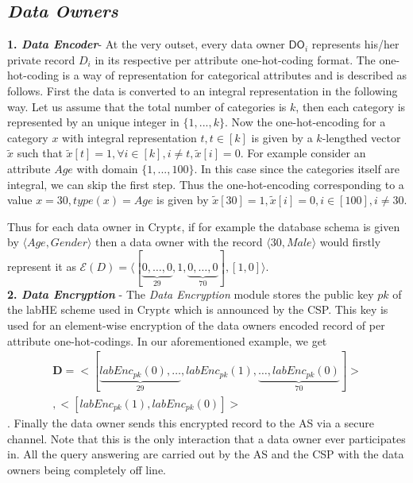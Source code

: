 \subsection*{\textit{Data Owners}}
\textbf{1. \textit{Data Encoder}}-  At the very outset, every data owner  $\textsf{DO}_i$ represents his/her private record $D_i$ in its respective per attribute one-hot-coding format. The one-hot-coding is a way of representation for categorical attributes and is described as follows. First the data is converted to an integral representation in the following way. Let us assume that the total number of categories is $k$, then each category is represented by an unique integer in $\{1,..., k\}$. Now the one-hot-encoding for a category $x$ with integral representation $t , t \in [k]$ is given by a $k$-lengthed vector $\tilde{x}$ such that $\tilde{x}[t]=1, \forall i \in [k], i\neq t, \tilde{x}[i]=0$. 
For example consider an attribute $Age$ with domain $\{1,...,100\}$. In this case since the categories itself are integral, we can skip the first step. Thus the one-hot-encoding corresponding to a value $x=30, type(x)=Age$ is given by $\tilde{x}[30]=1, \tilde{x}[i]=0, i \in [100], i \neq 30 $. 
Thus for each data owner in Crypt$\epsilon$, if for example  the database schema is given by  $\langle Age,Gender\rangle$ then a data owner with the record $\langle 30, Male\rangle$ would firstly represent it as $\mathcal{E}(D)=\langle[\underbrace{0,\ldots,0}_{29},1,\underbrace{0,\ldots,0}_{70}],[1,0]\rangle$. \\
\textbf{2. \textit{Data Encryption}} - The \textit{Data Encryption} module stores the public key $pk$ of the labHE scheme used in Crypt$\epsilon$ which is announced by the CSP. This key is used for an element-wise encryption of the data owners encoded record of per attribute one-hot-codings. In our aforementioned example, we get \begin{gather*}\mathbf{D}=<[\underbrace{labEnc_{pk}(0),\ldots}_{29},labEnc_{pk}(1),\underbrace{\ldots,labEnc_{pk}(0)}_{70}]>\\,
<[labEnc_{pk}(1),labEnc_{pk}(0)]>\end{gather*}. Finally the data owner sends this encrypted record to the AS via a secure channel. Note that this is the only interaction that a data owner ever participates in. All the query answering are carried out by the \textsf{AS} and the \textsf{CSP} with the data owners being completely off line.
